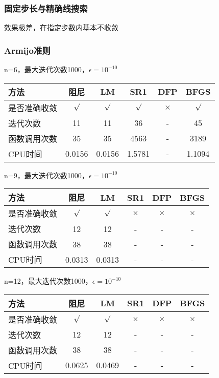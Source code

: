 \documentclass[11pt, a4paper]{article}
\begin{document}
\subsubsection{固定步长与精确线搜索}

效果极差，在指定步数内基本不收敛

\subsubsection{Armijo准则}

n=6，最大迭代次数1000，$\epsilon=10^{-10}$

\vspace{10pt}
\begin{tabular}{|l|c|c|c|c|c|}
	\hline
	方法 & 阻尼 & LM & SR1 & DFP & BFGS \\\hline
	是否准确收敛 & $\surd$ & $\surd$ & $\surd$ & $\times$ & $\surd$ \\\hline
	迭代次数 & 11 & 11 & 36 & - & 45 \\\hline
	函数调用次数 & 35 & 35 & 4563 & - & 3189 \\\hline
	CPU时间 & 0.0156 & 0.0156 & 1.5781 & - & 1.1094\\\hline
\end{tabular}

\vspace{20pt}
n=9，最大迭代次数1000，$\epsilon=10^{-10}$

\vspace{10pt}
\begin{tabular}{|l|c|c|c|c|c|}
	\hline
	方法 & 阻尼 & LM & SR1 & DFP & BFGS \\\hline
	是否准确收敛 & $\surd$ & $\surd$ & $\times$ & $\times$ & $\times$ \\\hline
	迭代次数 & 12 & 12 & - & - & - \\\hline
	函数调用次数 & 38 & 38 & - & - & - \\\hline
	CPU时间 & 0.0313 & 0.0313 & - & - & -\\\hline
\end{tabular}

\vspace{20pt}
n=12，最大迭代次数1000，$\epsilon=10^{-10}$

\vspace{10pt}
\begin{tabular}{|l|c|c|c|c|c|}
	\hline
	方法 & 阻尼 & LM & SR1 & DFP & BFGS \\\hline
	是否准确收敛 & $\surd$ & $\surd$ & $\times$ & $\times$ & $\times$ \\\hline
	迭代次数 & 12 & 12 & - & - & - \\\hline
	函数调用次数 & 38 & 38 & - & - & - \\\hline
	CPU时间 & 0.0625 & 0.0469 & - & - & -\\\hline
\end{tabular}
\end{document}
